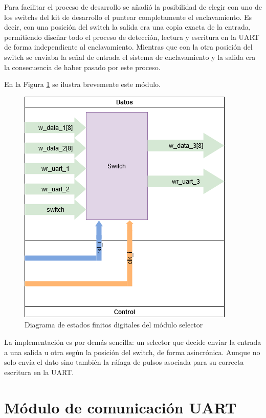 		Para facilitar el proceso de desarrollo se añadió la posibilidad de elegir con uno de los switchs del kit de desarrollo el puntear completamente el enclavamiento. Es decir, con una posición del switch la salida era una copia exacta de la entrada, permitiendo diseñar todo el proceso de detección, lectura y escritura en la UART de forma independiente al enclavamiento. Mientras que con la otra posición del switch se enviaba la señal de entrada el sistema de enclavamiento y la salida era la consecuencia de haber pasado por este proceso.
		
		En la Figura \ref{fig:FSMD_Selector} se ilustra brevemente este módulo.
		
		\begin{figure}[h]
		\centering
			\includegraphics[scale=.6]{./Figures/FSMD-Selector}
			\caption{Diagrama de estados finitos digitales del módulo selector}
			\label{fig:FSMD_Selector}
		\end{figure}	
		
		\vspace{5cm}
		
		La implementación es por demás sencilla: un selector que decide enviar la entrada a una salida u otra según la posición del switch, de forma asincrónica. Aunque no solo envía el dato sino también la ráfaga de pulsos asociada para su correcta escritura en la UART.
		
\section{Módulo de comunicación UART}

